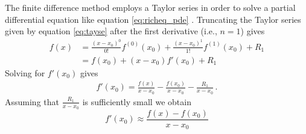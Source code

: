 The finite difference method employs a Taylor series in order to solve a partial differential equation like equation \eqref{eq:richeq_pde} \parencite{fornberg_finite_2011}.  Truncating the Taylor series given by equation \eqref{eq:tayse} after the first derivative (i.e., $n = 1$) gives
\begin{align*}
  f(x) &= \frac{(x - x_0)^0}{0!}f^{(0)}(x_0) + \frac{(x - x_0)^1}{1!}f^{(1)}(x_0) + R_1 \\
       &= f(x_0) + (x - x_0)f'(x_0) + R_1
\end{align*}
Solving for $f'(x_0)$ gives
\begin{align*}
  f'(x_0) = \frac{f(x)}{x - x_0} - \frac{f(x_0)}{x - x_0} - \frac{R_1}{x - x_0} \, .
\end{align*}
Assuming that $\frac{R_1}{x - x_0}$ is sufficiently small we obtain
\begin{equation}
  \label{eq:fidifmeth}
  f'(x_0) \approx \frac{f(x) - f(x_0)}{x - x_0}
\end{equation}

